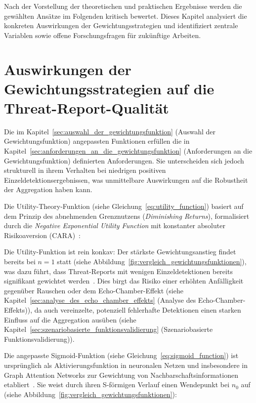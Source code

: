 Nach der Vorstellung der theoretischen und praktischen Ergebnisse werden die gewählten Ansätze im Folgenden kritisch bewertet. Dieses Kapitel analysiert die konkreten Auswirkungen der Gewichtungsstrategien und identifiziert zentrale Variablen sowie offene Forschungsfragen für zukünftige Arbeiten.

\section{Auswirkungen der Gewichtungsstrategien auf die Threat-Report-Qualität}

Die im Kapitel~\ref{sec:auswahl_der_gewichtungsfunktion} (Auswahl der Gewichtungsfunktion) angepassten Funktionen erfüllen die in Kapitel~\ref{sec:anforderungen_an_die_gewichtungsfunktion} (Anforderungen an die Gewichtungsfunktion) definierten Anforderungen. Sie unterscheiden sich jedoch strukturell in ihrem Verhalten bei niedrigen positiven Einzeldetektionsergebnissen, was unmittelbare Auswirkungen auf die Robustheit der Aggregation haben kann.

Die Utility-Theory-Funktion (siehe Gleichung~\ref{eq:utility_function}) basiert auf dem Prinzip des abnehmenden Grenznutzens (\textit{Diminishing Returns}), formalisiert durch die \textit{Negative Exponential Utility Function} mit konstanter absoluter Risikoaversion (CARA)~\cite[Sec.~8, Sec.~9]{norstad1999utility}:

Die Utility-Funktion ist rein konkav: Der stärkste Gewichtungsanstieg findet bereits bei $n = 1$ statt (siehe Abbildung~\ref{fig:vergleich_gewichtungsfunktionen}), was dazu führt, dass Threat-Reports mit wenigen Einzeldetektionen bereits signifikant gewichtet werden~\cite{norstad1999utility}. Dies birgt das Risiko einer erhöhten Anfälligkeit gegenüber Rauschen oder dem Echo-Chamber-Effekt (siehe Kapitel~\ref{sec:analyse_des_echo_chamber_effekts} (Analyse des Echo-Chamber-Effekts)), da auch vereinzelte, potenziell fehlerhafte Detektionen einen starken Einfluss auf die Aggregation ausüben (siehe Kapitel~\ref{sec:szenariobasierte_funktionsvalidierung} (Szenariobasierte Funktionsvalidierung)).

Die angepasste Sigmoid-Funktion (siehe Gleichung~\ref{eq:sigmoid_function}) ist ursprünglich als Aktivierungsfunktion in neuronalen Netzen und insbesondere in Graph Attention Networks zur Gewichtung von Nachbarschaftsinformationen etabliert~\cite{velickovic2018gat}. Sie weist durch ihren S-förmigen Verlauf einen Wendepunkt bei $n_0$ auf (siehe Abbildung~\ref{fig:vergleich_gewichtungsfunktionen}):

